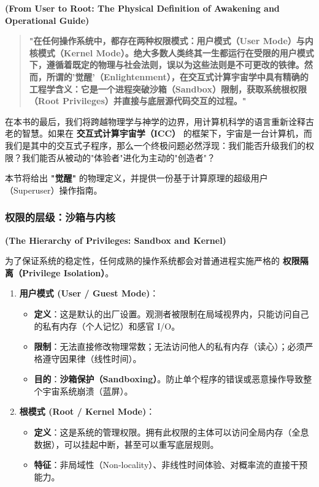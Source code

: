 \textbf{(From User to Root: The Physical Definition of Awakening and Operational Guide)}

\begin{quote}
\textbf{"在任何操作系统中，都存在两种权限模式：用户模式（User Mode）与内核模式（Kernel Mode）。绝大多数人类终其一生都运行在受限的用户模式下，遵循着既定的物理与社会法则，误以为这些法则是不可更改的铁律。然而，所谓的'觉醒'（Enlightenment），在交互式计算宇宙学中具有精确的工程学含义：它是一个进程突破沙箱（Sandbox）限制，获取系统根权限（Root Privileges）并直接与底层源代码交互的过程。"}
\end{quote}

在本书的最后，我们将跨越物理学与神学的边界，用计算机科学的语言重新诠释古老的智慧。如果在 \textbf{交互式计算宇宙学（ICC）} 的框架下，宇宙是一台计算机，而我们是其中的交互式子程序，那么一个终极问题必然浮现：我们能否升级我们的权限？我们能否从被动的"体验者"进化为主动的"创造者"？

本节将给出 \textbf{"觉醒"} 的物理定义，并提供一份基于计算原理的超级用户（Superuser）操作指南。

\subsubsection{权限的层级：沙箱与内核}

\textbf{(The Hierarchy of Privileges: Sandbox and Kernel)}

为了保证系统的稳定性，任何成熟的操作系统都会对普通进程实施严格的 \textbf{权限隔离（Privilege Isolation）}。

\begin{enumerate}
\item \textbf{用户模式 (User / Guest Mode)}：

      \begin{itemize}
      \item \textbf{定义}：这是默认的出厂设置。观测者被限制在局域视界内，只能访问自己的私有内存（个人记忆）和感官 I/O。

      \item \textbf{限制}：无法直接修改物理常数；无法访问他人的私有内存（读心）；必须严格遵守因果律（线性时间）。

      \item \textbf{目的}：\textbf{沙箱保护（Sandboxing）}。防止单个程序的错误或恶意操作导致整个宇宙系统崩溃（蓝屏）。
      \end{itemize}

\item \textbf{根模式 (Root / Kernel Mode)}：

      \begin{itemize}
      \item \textbf{定义}：这是系统的管理权限。拥有此权限的主体可以访问全局内存（全息数据），可以挂起中断，甚至可以重写底层规则。

      \item \textbf{特征}：非局域性（Non-locality）、非线性时间体验、对概率流的直接干预能力。
      \end{itemize}
\end{enumerate}

